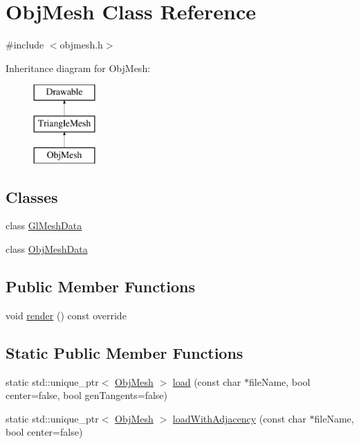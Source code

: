 \hypertarget{class_obj_mesh}{}\section{Obj\+Mesh Class Reference}
\label{class_obj_mesh}


{\ttfamily \#include $<$objmesh.\+h$>$}

Inheritance diagram for Obj\+Mesh\+:\begin{figure}[H]
\begin{center}
\leavevmode
\includegraphics[height=3.000000cm]{class_obj_mesh}
\end{center}
\end{figure}
\subsection*{Classes}
\begin{DoxyCompactItemize}
\item 
class \mbox{\hyperlink{class_obj_mesh_1_1_gl_mesh_data}{Gl\+Mesh\+Data}}
\item 
class \mbox{\hyperlink{class_obj_mesh_1_1_obj_mesh_data}{Obj\+Mesh\+Data}}
\end{DoxyCompactItemize}
\subsection*{Public Member Functions}
\begin{DoxyCompactItemize}
\item 
void \mbox{\hyperlink{class_obj_mesh_a735d4c7978094b8ba07cd720e496ea60}{render}} () const override
\end{DoxyCompactItemize}
\subsection*{Static Public Member Functions}
\begin{DoxyCompactItemize}
\item 
static std\+::unique\+\_\+ptr$<$ \mbox{\hyperlink{class_obj_mesh}{Obj\+Mesh}} $>$ \mbox{\hyperlink{class_obj_mesh_a783fd2e6bd401c6ec340946b0ca0ecb2}{load}} (const char $\ast$file\+Name, bool center=false, bool gen\+Tangents=false)
\item 
static std\+::unique\+\_\+ptr$<$ \mbox{\hyperlink{class_obj_mesh}{Obj\+Mesh}} $>$ \mbox{\hyperlink{class_obj_mesh_adc7c1c7e377349666929592343fb627c}{load\+With\+Adjacency}} (const char $\ast$file\+Name, bool center=false)
\end{DoxyCompactItemize}

